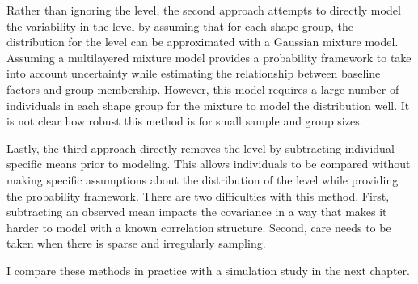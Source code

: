 Rather than ignoring the level, the second approach attempts to directly model the variability in the level by assuming that for each shape group, the distribution for the level can be approximated with a Gaussian mixture model. Assuming a multilayered mixture model provides a probability framework to take into account uncertainty while estimating the relationship between baseline factors and group membership. However, this model requires a large number of individuals in each shape group for the mixture to model the distribution well. It is not clear how robust this method is for small sample and group sizes.

Lastly, the third approach directly removes the level by subtracting individual-specific means prior to modeling. This allows individuals to be compared without making specific assumptions about the distribution of the level while providing the probability framework.  There are two difficulties with this method. First, subtracting an observed mean impacts the covariance in a way that makes it harder to model with a known correlation structure. Second, care needs to be taken when there is sparse and irregularly sampling. 

I compare these methods in practice with a simulation study in the next chapter.
